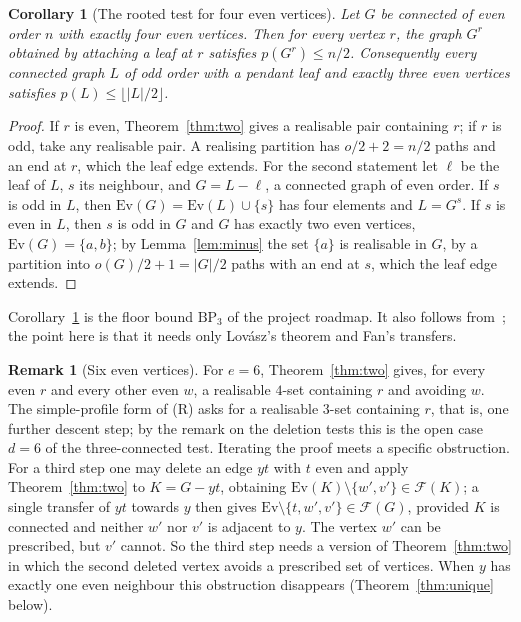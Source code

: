 \documentclass[11pt]{amsart}
\newtheorem{corollary}[theorem]{Corollary}
\theoremstyle{definition}
\newtheorem{remark}[theorem]{Remark}
\newcommand{\cF}{\mathcal F}
\newcommand{\Ev}{\mathrm{Ev}}
\begin{document}
\begin{corollary}[The rooted test for four even vertices]\label{cor:rooted4}
Let $G$ be connected of even order $n$ with exactly four even vertices. Then for every vertex $r$,
the graph $G^r$ obtained by attaching a leaf at $r$ satisfies $p(G^r)\le n/2$. Consequently every
connected graph $L$ of odd order with a pendant leaf and exactly three even vertices satisfies
$p(L)\le\lfloor|L|/2\rfloor$.
\end{corollary}

\begin{proof}
If $r$ is even, Theorem~\ref{thm:two} gives a realisable pair containing $r$; if $r$ is odd, take
any realisable pair. A realising partition has $o/2+2=n/2$ paths and an end at $r$, which the leaf
edge extends. For the second statement let $\ell$ be the leaf of $L$, $s$ its neighbour, and
$G=L-\ell$, a connected graph of even order. If $s$ is odd in $L$, then $\Ev(G)=\Ev(L)\cup\{s\}$ has
four elements and $L=G^s$. If $s$ is even in $L$, then $s$ is odd in $G$ and $G$ has exactly two even
vertices, $\Ev(G)=\{a,b\}$; by Lemma~\ref{lem:minus} the set $\{a\}$ is realisable in $G$, by a
partition into $o(G)/2+1=|G|/2$ paths with an end at $s$, which the leaf edge extends.
\end{proof}

Corollary~\ref{cor:rooted4} is the floor bound $\mathrm{BP}_3$ of the project roadmap. It also follows
from~\cite[Theorem~13]{BS}; the point here is that it needs only Lov\'asz's theorem and Fan's
transfers.

\begin{remark}[Six even vertices]
For $e=6$, Theorem~\ref{thm:two} gives, for every even $r$ and every other even $w$, a realisable
$4$-set containing $r$ and avoiding $w$. The simple-profile form of (R) asks for a realisable
$3$-set containing $r$, that is, one further descent step; by the remark on the deletion tests this
is the open case $d=6$ of the three-connected test. Iterating the proof meets a specific obstruction.
For a third step one may delete an edge $yt$ with $t$ even and apply Theorem~\ref{thm:two} to
$K=G-yt$, obtaining $\Ev(K)\setminus\{w',v'\}\in\cF(K)$; a single transfer of $yt$ towards $y$ then
gives $\Ev\setminus\{t,w',v'\}\in\cF(G)$, provided $K$ is connected and neither $w'$ nor $v'$ is
adjacent to $y$. The vertex $w'$ can be prescribed, but $v'$ cannot. So the third step needs a version
of Theorem~\ref{thm:two} in which the second deleted vertex avoids a prescribed set of vertices. When
$y$ has exactly one even neighbour this obstruction disappears (Theorem~\ref{thm:unique} below).
\end{remark}
\end{document}
